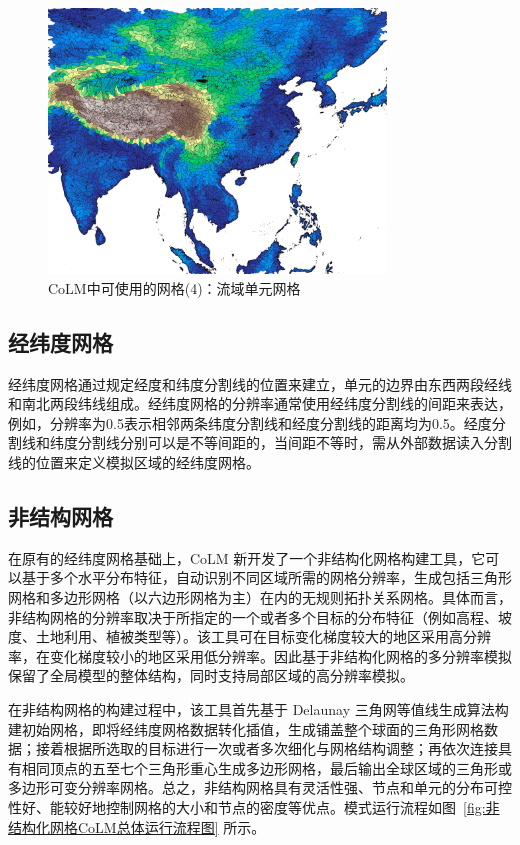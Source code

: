 {
  \begin{figure}[htbp]
    \centering
    \includegraphics[width=0.8\textwidth]{Figures/模式构架/网格-流域.jpg}
    \caption{CoLM中可使用的网格(4)：流域单元网格}
    \label{fig:流域单元网格}
  \end{figure}
}

\subsection{经纬度网格}\label{经纬度网格}
经纬度网格通过规定经度和纬度分割线的位置来建立，单元的边界由东西两段经线和南北两段纬线组成。经纬度网格的分辨率通常使用经纬度分割线的间距来表达，例如，分辨率为0.5\textdegree 表示相邻两条纬度分割线和经度分割线的距离均为0.5\textdegree。经度分割线和纬度分割线分别可以是不等间距的，当间距不等时，需从外部数据读入分割线的位置来定义模拟区域的经纬度网格。

\subsection{非结构网格}\label{非结构网格}
在原有的经纬度网格基础上，CoLM 新开发了一个非结构化网格构建工具，它可以基于多个水平分布特征，自动识别不同区域所需的网格分辨率，生成包括三角形网格和多边形网格（以六边形网格为主）在内的无规则拓扑关系网格。具体而言，非结构网格的分辨率取决于所指定的一个或者多个目标的分布特征（例如高程、坡度、土地利用、植被类型等）。该工具可在目标变化梯度较大的地区采用高分辨率，在变化梯度较小的地区采用低分辨率。因此基于非结构化网格的多分辨率模拟保留了全局模型的整体结构，同时支持局部区域的高分辨率模拟。

在非结构网格的构建过程中，该工具首先基于 Delaunay 三角网等值线生成算法构建初始网格，即将经纬度网格数据转化插值，生成铺盖整个球面的三角形网格数据；接着根据所选取的目标进行一次或者多次细化与网格结构调整；再依次连接具有相同顶点的五至七个三角形重心生成多边形网格，最后输出全球区域的三角形或多边形可变分辨率网格。总之，非结构网格具有灵活性强、节点和单元的分布可控性好、能较好地控制网格的大小和节点的密度等优点。模式运行流程如图~\ref{fig:非结构化网格CoLM总体运行流程图} 所示。

